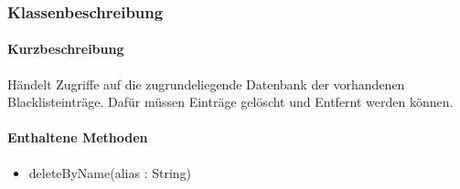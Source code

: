 \subsubsection*{Klassenbeschreibung}%
\paragraph*{Kurzbeschreibung}
Händelt Zugriffe auf die zugrundeliegende Datenbank der vorhandenen Blacklisteinträge.
Dafür müssen Einträge gelöscht und Entfernt werden können.
\paragraph*{Enthaltene Methoden}
\begin{itemize}
    \item deleteByName(alias : String)
\end{itemize}
